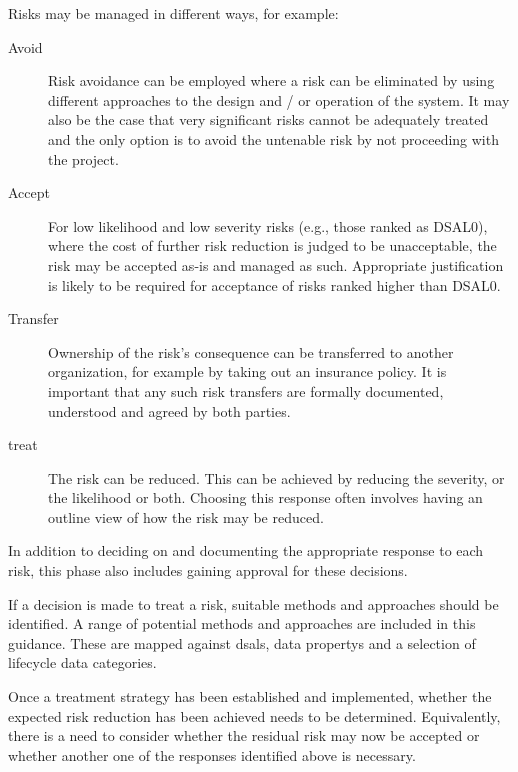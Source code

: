 Risks may be managed in different ways, for example:

\begin{description}
  \item[Avoid]Risk avoidance can be employed where a risk can be eliminated by using different approaches to the design and / or operation of the system. It may also be the case that very significant risks cannot be adequately treated and the only option is to avoid the untenable risk by not proceeding with the project.
  \item[Accept]For low likelihood and low severity risks (e.g., those ranked as DSAL0), where the cost of further risk reduction is judged to be unacceptable, the risk may be accepted as-is and managed as such. Appropriate justification is likely to be required for acceptance of risks ranked higher than DSAL0.
  \item[Transfer]Ownership of the risk's consequence can be transferred to another organization, for example by taking out an insurance policy. It is important that any such risk transfers are formally documented, understood and agreed by both parties.
  \item[\Gls{treat}]The risk can be reduced. This can be achieved by reducing the severity, or the likelihood or both. Choosing this \gls{response} often involves having an outline view of how the risk may be reduced.
\end{description}

In addition to deciding on and documenting the appropriate \gls{response} to each risk, this phase also includes gaining approval for these decisions.

If a decision is made to \gls{treat} a risk, suitable methods and approaches should be identified. A range of potential methods and approaches are included in this guidance. These are mapped against \glspl{dsal}, \glspl{data property} and a selection of lifecycle data categories.

Once a \gls{treatment} strategy has been established and implemented, whether the expected risk reduction has been achieved needs to be determined. Equivalently, there is a need to consider whether the residual risk may now be accepted or whether another one of the \glspl{response} identified above is necessary.

